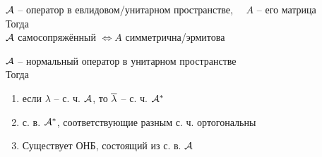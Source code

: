 \begin{property}
	$ \mathcal{A} $ -- оператор в евлидовом/унитарном пространстве, $ \quad A $ -- его матрица  \\
	Тогда \\
	$ \mathcal{A} $ самосопряжённый $ \iff A $ симметрична/эрмитова
\end{property}

\begin{theorem}
	$ \mathcal{A} $ -- нормальный оператор в унитарном пространстве \\
	Тогда
	\begin{enumerate}
		\item если $ \lambda $ -- с. ч. $ \mathcal{A} $, то $ \overline\lambda $ -- с. ч. $ \mathcal{A}^* $
		\item с. в. $ \mathcal{A}^* $, соответствующие разным с. ч. ортогональны
		\item Существует ОНБ, состоящий из с. в. $ \mathcal{A} \quad $ 
	\end{enumerate}

\end{theorem}
